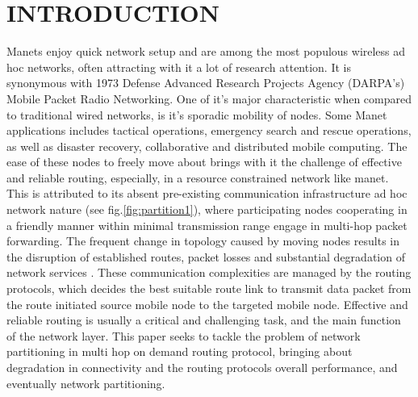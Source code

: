 \documentclass[letterpaper, 10 pt, conference]{ieeeconf}  %
\begin{document}



\section{INTRODUCTION}
Manets enjoy quick network setup and are among the most populous wireless ad hoc networks, often attracting with it a lot of research attention. It is synonymous with 1973 Defense Advanced Research Projects Agency (DARPA's) Mobile Packet Radio Networking\cite{Jubin1987TheProtocols}. One of it's major characteristic when compared to traditional wired networks, is it's sporadic mobility of nodes. Some Manet applications includes tactical operations, emergency search and rescue operations, as well as disaster recovery, collaborative and distributed mobile computing. The ease of these nodes to freely move about brings with it the challenge of effective and reliable routing, especially, in a resource constrained network like manet. This is attributed to its absent pre-existing communication infrastructure ad hoc network nature (see fig.\ref{fig:partition1}), where participating nodes cooperating in a friendly manner within minimal transmission range engage in multi-hop packet forwarding. The frequent change in topology caused by moving nodes results in the disruption of established routes, packet losses and substantial degradation of network services \cite{Su2001MobilityNetworks}. These communication complexities are managed by the routing protocols, which decides the best suitable route link to transmit data packet from the route initiated source mobile node to the targeted mobile node. Effective and reliable routing is usually a critical and challenging task, and the main function of the network layer.  This paper seeks to tackle the problem of network partitioning in multi hop on demand routing protocol, bringing about degradation in connectivity and the routing protocols overall performance, and eventually network partitioning. 
\end{document}
